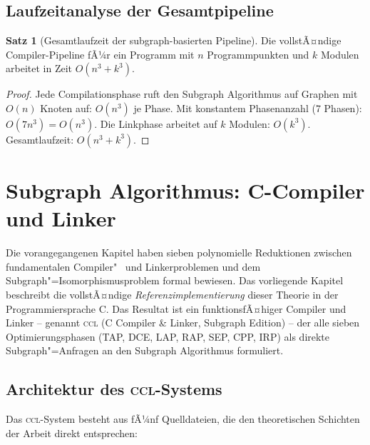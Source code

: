 ﻿\documentclass[a4paper,12pt]{article}
\theoremstyle{definition}
\newtheorem{satz}{Satz}
\begin{document}
\subsection{Laufzeitanalyse der Gesamtpipeline}

\begin{satz}[Gesamtlaufzeit der subgraph-basierten Pipeline]
Die vollstÃ¤ndige Compiler-Pipeline fÃ¼r ein Programm mit $n$ Programmpunkten und $k$ Modulen arbeitet in Zeit $O(n^3 + k^3)$.
\end{satz}

\begin{proof}
Jede Compilationsphase ruft den Subgraph Algorithmus auf Graphen mit $O(n)$ Knoten auf: $O(n^3)$ je Phase. Mit konstantem Phasenanzahl (7 Phasen): $O(7 n^3) = O(n^3)$. Die Linkphase arbeitet auf $k$ Modulen: $O(k^3)$. Gesamtlaufzeit: $O(n^3 + k^3)$.
\end{proof}

\section{Subgraph Algorithmus: C-Compiler und Linker}
\label{sec:implementierung}

Die vorangegangenen Kapitel haben sieben polynomielle Reduktionen zwischen
fundamentalen Compiler"~ und Linkerproblemen und dem Subgraph"=Iso\-morphismus\-problem
formal bewiesen. Das vorliegende Kapitel beschreibt die vollstÃ¤ndige
\emph{Referenzimplementierung} dieser Theorie in der Programmiersprache C.
Das Resultat ist ein funktionsfÃ¤higer Compiler und Linker -- genannt
\textsc{ccl} (C Compiler \& Linker, Subgraph Edition) -- der alle sieben
Optimierungsphasen (TAP, DCE, LAP, RAP, SEP, CPP, IRP) als direkte
Subgraph"=Anfragen an den Subgraph Algorithmus formuliert.

\subsection{Architektur des \textsc{ccl}-Systems}

Das \textsc{ccl}-System besteht aus fÃ¼nf Quelldateien, die den theoretischen
Schichten der Arbeit direkt entsprechen:
\end{document}
